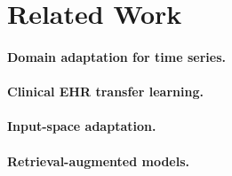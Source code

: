 \section{Related Work}
\label{sec:related_work}



\paragraph{Domain adaptation for time series.}

\paragraph{Clinical EHR transfer learning.}

\paragraph{Input-space adaptation.}

\paragraph{Retrieval-augmented models.}
